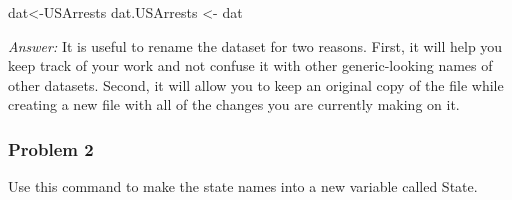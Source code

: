 \documentclass[
]{article}
\newenvironment{Shaded}{\begin{snugshade}}{\end{snugshade}}
\newcommand{\FunctionTok}[1]{\textcolor[rgb]{0.00,0.00,0.00}{#1}}
\newcommand{\NormalTok}[1]{#1}
\newcommand{\OtherTok}[1]{\textcolor[rgb]{0.56,0.35,0.01}{#1}}
\newcommand{\SpecialCharTok}[1]{\textcolor[rgb]{0.00,0.00,0.00}{#1}}
\begin{document}
\begin{Shaded}
\begin{Highlighting}[]
\NormalTok{dat}\OtherTok{\textless{}{-}}\NormalTok{USArrests}
\NormalTok{dat.USArrests }\OtherTok{\textless{}{-}}\NormalTok{ dat}
\end{Highlighting}
\end{Shaded}

\emph{Answer:} It is useful to rename the dataset for two reasons.
First, it will help you keep track of your work and not confuse it with
other generic-looking names of other datasets. Second, it will allow you
to keep an original copy of the file while creating a new file with all
of the changes you are currently making on it.

\hypertarget{problem-2}{%
\subsubsection{Problem 2}\label{problem-2}}

Use this command to make the state names into a new variable called
State.

\begin{Shaded}
\end{Shaded}
\end{document}

